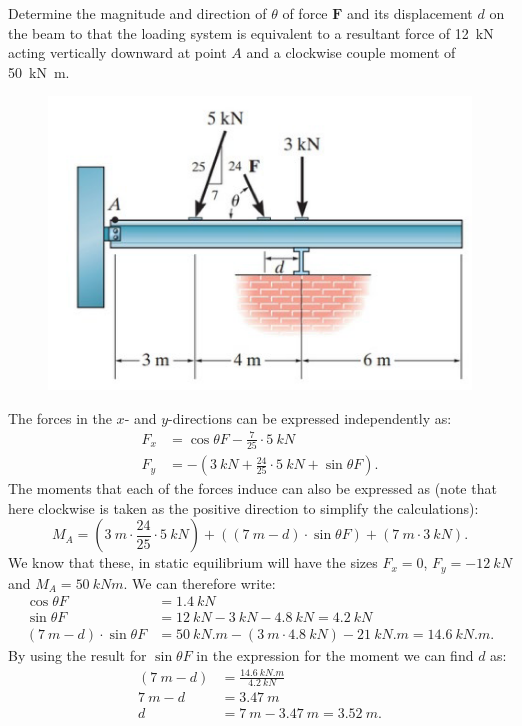 \documentclass[a4paper]{article}
\begin{document}
Determine the magnitude and direction of $\theta$ of force $\textbf{F}$ and its displacement $d$ on the beam to that the loading system is equivalent to a resultant force of \qty{12}{kN} acting vertically downward at point $A$ and a clockwise couple moment of \qty{50}{kN.m}.

\begin{figure} [ht]
  \centering
  \includegraphics[width=0.5\linewidth]{../figures/P3_1.png}
\end{figure}
\bigbreak
The forces in the $x$- and $y$-directions can be expressed independently as:
\begin{align*}
  F_{x} &= \cos \theta F - \frac{7}{25} \cdot  \qty{5}{kN}  \\
  F_y &= - \left( \qty{3}{kN} + \frac{24}{25} \cdot  \qty{5}{kN} + \sin \theta F \right) 
.\end{align*}
The moments that each of the forces induce can also be expressed as (note that here clockwise is taken as the positive direction to simplify the calculations):
\[ 
M_A = \left( \qty{3}{m} \cdot \frac{24}{25} \cdot  \qty{5}{kN}  \right) + \left( \left( \qty{7}{m} - d \right) \cdot \sin \theta F \right) + \left( \qty{7}{m} \cdot \qty{3}{kN}  \right) 
.\]
We know that these, in static equilibrium will have the sizes $F_x = 0$, $F_y = -\qty{12}{kN}$ and $M_A = \qty{50}{kN m}$. We can therefore write:
\begin{align*}
  \cos \theta F &= \qty{1,4}{kN}  \\
  \sin \theta F &= \qty{12}{kN} - \qty{3}{kN} - \qty{4,8}{kN} = \qty{4,2}{kN}  \\
  \left( \qty{7}{m} - d \right) \cdot \sin \theta F &= \qty{50}{kN.m} - \left( \qty{3}{m} \cdot \qty{4,8}{kN} \right) - \qty{21}{kN.m} = \qty{14,6}{kN.m} 
.\end{align*}
By using the result for $\sin \theta F$ in the expression for the moment we can find $d$ as:
\begin{align*}
  \left( \qty{7}{m} - d \right)  &= \frac{\qty{14,6}{kN.m}}{\qty{4,2}{kN}} \\
  \qty{7}{m} - d &= \qty{3,47}{m} \\
  d &= \qty{7}{m} - \qty{3,47}{m} = \qty{3,52}{m} 
.\end{align*}
\end{document}
